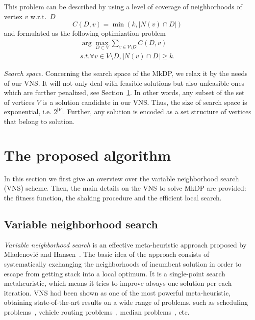\documentclass[dvipsnames,format=sigconf,anonymous=true,review=true]{acmart}
\begin{document}
    
    This problem can be described by using a level of coverage of neighborhoods of vertex $v$ w.r.t.\ $D$
    \begin{equation}
    	C(D, v) = \min(k, |N(v) \cap D|)
    \end{equation}
and  formulated as the following optimization problem 
\begin{align}
    \arg \max_{D \subset V } \sum_{v \in V\setminus D} C(D,v) \\
    s.t. \forall v \in V \setminus D, |N(v) \cap D| \geq k.
\end{align}
    
\emph{Search space}.    Concerning the search space of the MkDP, we relax it by the needs of our VNS. It will not only deal with feasible solutions but also unfeasible ones  which are further  penalized, see Section~\ref{sec:vns}.  In other words, any subset of the set of vertices $V$ is a solution candidate in our VNS. Thus, the size of search space is exponential, i.e. $2^{|V|}$.  Further, any solution is encoded as a set structure of vertices that belong to solution. 
   
   
\section{The proposed algorithm}\label{sec:vns}

In this section we first give an overview over the variable neighborhood search (VNS) scheme. Then, the main details on the VNS to solve MkDP are provided: the fitness function, the shaking procedure and the efficient local search.
 
  \subsection{Variable neighborhood search}
 \emph{Variable neighborhood search} is an effective meta-heuristic approach proposed by Mladenović and Hansen~\cite{mladenovic1997variable}. The basic idea of the approach consists of systematically exchanging the neighborhoods of incumbent solution in order to escape from getting stack into a  local optimum. It is a single-point search metaheuristic, which means it tries to improve always one solution per each iteration. VNS had been shown as one of the most powerful meta-heuristic, obtaining state-of-the-art results on a wide range of problems, such as scheduling problems~\cite{fleszar2004solving}, vehicle routing problems~\cite{rezgui2019application}, median problems~\cite{herran2019variable}, etc.  
  
\end{document}

